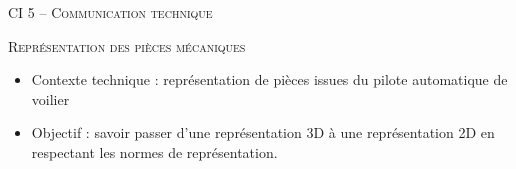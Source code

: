 \documentclass[11pt,oneside]{article}
\begin{document}
\pagestyle{fancy}
\renewcommand{\headrulewidth}{0pt}

\fancyhead{}

\fancyhead[C]{\rule{11cm}{.5pt}}


\renewcommand{\footrulewidth}{0.2pt}

\fancyfoot[C]{\footnotesize{\bfseries \thepage}}




\begin{center}
 \huge\textsc{CI 5 -- Communication technique}
\end{center}

\begin{center}
 \LARGE\textsc{Représentation des pièces mécaniques}
\end{center}

\vspace{.5cm}


\begin{contexte}
\begin{itemize}
\item Contexte technique : représentation de pièces issues du pilote automatique de voilier
\item Objectif : savoir passer d'une représentation 3D à une représentation 2D en respectant les normes de représentation.
\end{itemize}
\end{contexte}
\end{document}
